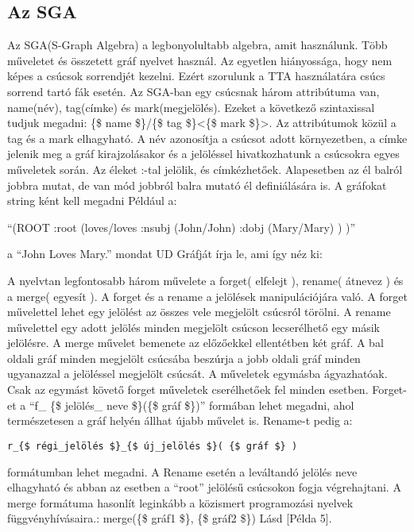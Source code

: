 \subsection{Az SGA}
Az SGA(S-Graph Algebra) a legbonyolultabb algebra, amit használunk. Több műveletet és összetett gráf nyelvet használ. Az egyetlen hiányossága, hogy nem képes a csúcsok sorrendjét kezelni. Ezért szorulunk a TTA használatára csúcs sorrend tartó fák esetén. Az SGA-ban egy csúcsnak három attribútuma van, name(név), tag(címke) és mark(megjelölés). Ezeket a következő szintaxissal tudjuk megadni: \{\$ name \$\}/\{\$ tag \$\}<\{\$ mark \$\}>. Az attribútumok közül a tag és a mark elhagyható. A név azonosítja a csúcsot adott környezetben, a címke jelenik meg a gráf kirajzolásakor és a jelöléssel hivatkozhatunk a csúcsokra egyes műveletek során. Az éleket :-tal jelölik, és címkézhetőek. Alapesetben az él balról jobbra mutat, de van mód jobbról balra mutató él definiálására is. A gráfokat string ként kell megadni Például a:

“(ROOT :root (loves/loves :nsubj (John/John) :dobj (Mary/Mary) ) )”

a “John Loves Mary.” mondat UD Gráfját írja le, ami így néz ki:


A nyelvtan legfontosabb három művelete a forget( elfelejt ), rename( átnevez ) és a merge( egyesít ). A forget és a rename a jelölések manipulációjára való. A forget művelettel lehet egy jelölést az összes vele megjelölt csúcsról törölni. A rename művelettel egy adott jelölés minden megjelölt csúcson lecserélhető egy másik jelölésre. A merge művelet bemenete az előzőekkel ellentétben két gráf. A bal oldali gráf minden megjelölt csúcsába beszúrja a jobb oldali gráf minden ugyanazzal a jelöléssel megjelölt csúcsát. A műveletek egymásba ágyazhatóak. Csak az egymást követő forget műveletek cserélhetőek fel minden esetben. Forget-et a “f\_ \{\$ jelölés\_ neve \$\}(\{\$ gráf \$\})”
 formában lehet megadni, ahol természetesen a gráf helyén állhat újabb művelet is.  Rename-t pedig a:
\begin{verbatim}
r_{$ régi_jelölés $}_{$ új_jelölés $}( {$ gráf $} )
\end{verbatim}
formátumban lehet megadni. A Rename esetén a leváltandó jelölés neve elhagyható és abban az esetben a “root” jelölésű csúcsokon fogja végrehajtani. A merge formátuma hasonlít leginkább a közismert programozási nyelvek függvényhívásaira.: merge(\{\$ gráf1 \$\}, \{\$ gráf2 \$\}) Lásd [Példa 5].

